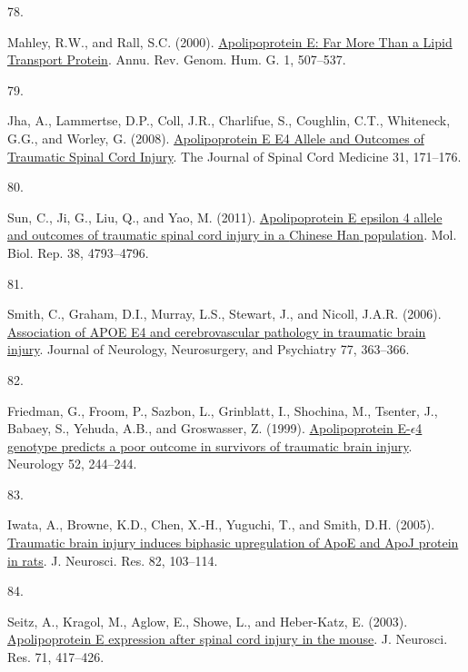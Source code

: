 \documentclass[
]{article}
\newlength{\cslhangindent}
\newlength{\csllabelwidth}
\newlength{\cslentryspacingunit} %
\newenvironment{CSLReferences}[2] %
 {%
  \setlength{\parindent}{0pt}
  \ifodd #1
  \let\oldpar\par
  \def\par{\hangindent=\cslhangindent\oldpar}
  \fi
  \setlength{\parskip}{#2\cslentryspacingunit}
 }%
 {}
\newcommand{\CSLLeftMargin}[1]{\parbox[t]{\csllabelwidth}{#1}}
\newcommand{\CSLRightInline}[1]{\parbox[t]{\linewidth - \csllabelwidth}{#1}\break}
\begin{document}
\begin{CSLReferences}{0}{0}
\leavevmode{}%
\CSLLeftMargin{78. }
\CSLRightInline{Mahley, R.W., and Rall, S.C. (2000). \href{https://doi.org/10.1146/annurev.genom.1.1.507}{Apolipoprotein {E}: {Far More Than} a {Lipid Transport Protein}}. Annu. Rev. Genom. Hum. G. 1, 507--537.}

\leavevmode{}%
\CSLLeftMargin{79. }
\CSLRightInline{Jha, A., Lammertse, D.P., Coll, J.R., Charlifue, S., Coughlin, C.T., Whiteneck, G.G., and Worley, G. (2008). \href{https://www.ncbi.nlm.nih.gov/pmc/articles/PMC2565476}{Apolipoprotein {E E4 Allele} and {Outcomes} of {Traumatic Spinal Cord Injury}}. The Journal of Spinal Cord Medicine 31, 171--176.}

\leavevmode{}%
\CSLLeftMargin{80. }
\CSLRightInline{Sun, C., Ji, G., Liu, Q., and Yao, M. (2011). \href{https://doi.org/10.1007/s11033-010-0620-2}{Apolipoprotein {E} epsilon 4 allele and outcomes of traumatic spinal cord injury in a {Chinese Han} population}. Mol. Biol. Rep. 38, 4793--4796.}

\leavevmode{}%
\CSLLeftMargin{81. }
\CSLRightInline{Smith, C., Graham, D.I., Murray, L.S., Stewart, J., and Nicoll, J.A.R. (2006). \href{https://doi.org/10.1136/jnnp.2005.074617}{Association of {APOE} E4 and cerebrovascular pathology in traumatic brain injury}. Journal of Neurology, Neurosurgery, and Psychiatry 77, 363--366.}

\leavevmode{}%
\CSLLeftMargin{82. }
\CSLRightInline{Friedman, G., Froom, P., Sazbon, L., Grinblatt, I., Shochina, M., Tsenter, J., Babaey, S., Yehuda, A.B., and Groswasser, Z. (1999). \href{https://doi.org/10.1212/WNL.52.2.244}{Apolipoprotein {E-\(\epsilon\)4} genotype predicts a poor outcome in survivors of traumatic brain injury}. Neurology 52, 244--244.}

\leavevmode{}%
\CSLLeftMargin{83. }
\CSLRightInline{Iwata, A., Browne, K.D., Chen, X.-H., Yuguchi, T., and Smith, D.H. (2005). \href{https://doi.org/10.1002/jnr.20607}{Traumatic brain injury induces biphasic upregulation of {ApoE} and {ApoJ} protein in rats}. J. Neurosci. Res. 82, 103--114.}

\leavevmode{}%
\CSLLeftMargin{84. }
\CSLRightInline{Seitz, A., Kragol, M., Aglow, E., Showe, L., and Heber-Katz, E. (2003). \href{https://doi.org/10.1002/jnr.10482}{Apolipoprotein {E} expression after spinal cord injury in the mouse}. J. Neurosci. Res. 71, 417--426.}


\end{CSLReferences}
\end{document}
